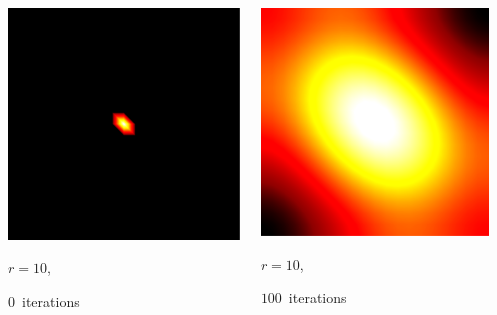 \documentclass[aspectratio=169,t]{beamer}
\begin{document}
{\begin{columns}
\begin{column}{0.22\textwidth}
			\includegraphics[width=.85\textwidth]{data/synthetic_meshes/square_tesselation_2tri_Dirac_delta_10_v441_f800_funcvals_0iter.png}
			{\footnotesize
				\par \vspace{-1mm} $r=10$,
				\par \vspace{-1mm} $0$~iterations
			}
		\end{column}
		\begin{column}{0.22\textwidth}
			\centering
			\includegraphics[width=.85\textwidth]{data/synthetic_meshes/square_tesselation_2tri_Dirac_delta_10_v441_f800_funcvals_100iter.png}
			{\footnotesize
				\par \vspace{-1mm} $r=10$,
				\par \vspace{-1mm} $100$~iterations
			}
		\end{column}
		\begin{column}{0.17\textwidth}~\end{column}
	\end{columns}
}
\end{document}

